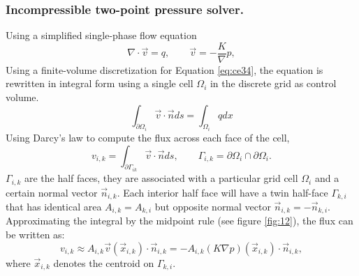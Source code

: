 \documentclass[a4paper,10pt]{report}
\begin{document}
\subsubsection{Incompressible two-point pressure solver.}
Using a simplified single-phase flow equation 
\begin{equation}\label{eq:ce34}
 \nabla \cdot  \vec{v}=q, \qquad \vec{v}=-\frac{K}\nabla p,
\end{equation}
Using a finite-volume discretization for Equation \eqref{eq:ce34}, the equation is rewritten in integral form using a single cell $\Omega_i$ in the discrete grid as control volume.
\begin{equation}
 \int_{\partial \Omega_i}\vec{v}\cdot \vec{n} ds=\int_{ \Omega_i}q dx
\end{equation}
Using Darcy's law to compute the flux across each face of the cell,
\begin{equation}
 v_{i,k}=\int_{\partial \Gamma_{ik}}\vec{v}\cdot \vec{n} ds,\qquad \Gamma_{i,k}=\partial \Omega_i\cap \partial \Omega_i.
\end{equation}
$\Gamma_{i,k}$ are the half faces, they are associated with a particular grid cell $\Omega_i$ and a certain normal vector $\vec{n}_{i,k}$. Each interior half face will have a twin
half-face $\Gamma_{k,i}$ that has identical area $A_{i,k}=A_{k,i}$ but opposite normal vector $\vec{n}_{i,k}=-\vec{n}_{k,i}$.
Approximating the integral by the midpoint rule (see figure \ref{fig:12}), the flux can be written as:
\begin{equation}\label{eq:dap}
 v_{i,k} \approx     A_{i,k}\vec{v}(\vec{x}_{i,k})\cdot \vec{n}_{i,k}=-A_{i,k}(K \nabla p) (\vec{x}_{i,k})\cdot \vec{n}_{i,k},
\end{equation}
where $\vec{x}_{i,k}$ denotes the centroid on $\Gamma_{k,i}$. 
\end{document}
